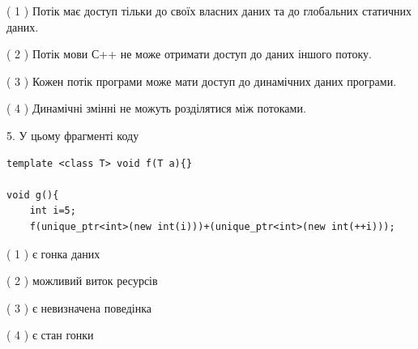 \documentclass[12pt, ukrainian]{article}
\begin{document}
\begin {large}
{( 1 ) Потік має доступ тільки до своїх власних даних та до глобальних статичних даних.%

( 2 ) Потік мови С++ не може отримати доступ до даних іншого потоку.%

( 3 ) Кожен потік програми може мати доступ до динамічних даних програми.%

( 4 ) Динамічні змінні не можуть розділятися між потоками.%


5. У цьому фрагменті коду
\begin{verbatim}
template <class T> void f(T a){}

void g(){
    int i=5;
    f(unique_ptr<int>(new int(i)))+(unique_ptr<int>(new int(++i)));
\end{verbatim}
( 1 ) є гонка даних%

( 2 ) можливий виток ресурсів%

( 3 ) є невизначена поведінка%

( 4 ) є стан гонки%
}
\end {large}
\end{document}
